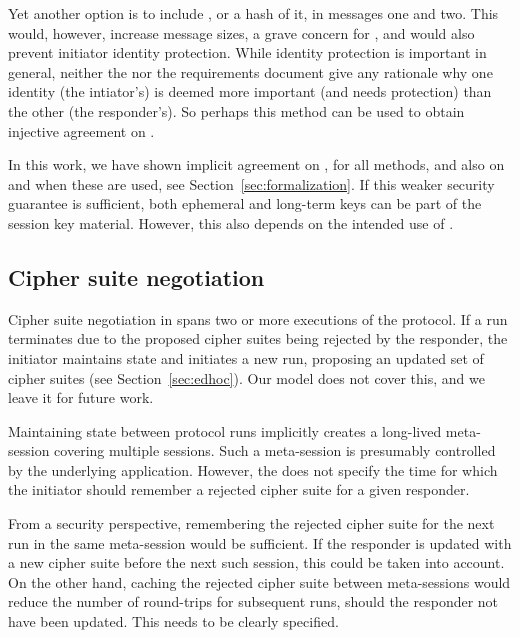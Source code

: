 \documentclass[runningheads, envcountsame, a4paper, draft, x11names]{llncs}
\newcommand{\spacehack}{\vspace{-1em}}
\newcommand{\fillhack}{\vspace{-0.5em}}
\begin{document}
Yet another option is to include \mGi{}, or a hash of it, in messages one and two. This would, however, increase message sizes, a grave concern for \mEdhoc{}, and would also prevent initiator identity protection. While identity protection is important in general, neither the \mSpec{} nor the requirements document give any rationale why one identity (the intiator's) is deemed more important (and needs protection) than the other (the responder's). So perhaps this method can be used to obtain injective agreement on \mGiy. 

%
%
%
In this work, we have shown implicit agreement on \mGx{}, \mGy{} for all methods, and also on \mGiy{} and \mGrx{} when these are used, see Section~\ref{sec:formalization}. If this weaker security guarantee is sufficient, both ephemeral and long-term keys can be part of the session key material. However, this also depends on the intended use of \mEdhoc{}.
%

\spacehack
\subsection{Cipher suite negotiation}
\label{sec:ciphersuiteNegotiation}
\fillhack
%
Cipher suite negotiation in \mEdhoc{} spans two or more executions of the protocol. If a run terminates due to the proposed cipher suites being rejected by the responder, the initiator maintains state and initiates a new run, proposing an updated set of cipher suites (see Section~\ref{sec:edhoc}). Our model does not cover this, and we leave it for future work.

Maintaining state between protocol runs implicitly creates a long-lived meta-session covering multiple \mEdhoc{} sessions. Such a meta-session is presumably controlled by the underlying application. However, the \mSpec{} does not specify the time for which the initiator should remember a rejected cipher suite for a given responder.

%
From a security perspective, remembering the rejected cipher suite for the
next \mEdhoc{} run in the same meta-session would be sufficient. If the responder is updated with a new cipher suite before the next such session, this could be taken into account. On the other hand, caching the rejected cipher suite between meta-sessions would reduce the number of round-trips for subsequent runs, should the responder not have been updated. This needs to be clearly specified. 
\end{document}
